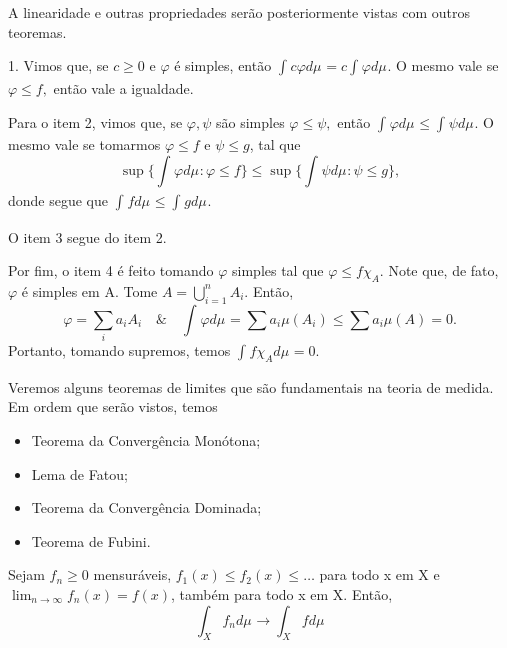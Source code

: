 \documentclass[MeasureTheory/measure_theory.tex]{subfiles}
\begin{document}
\begin{proof*}
	A linearidade e outras propriedades serão posteriormente vistas com outros teoremas.

	1. Vimos que, se \(c \geq 0\) e \(\varphi \) é simples, então \(\int_{}c \varphi  d\mu_{} = c \int_{}\varphi  d\mu_{}\). O mesmo vale se \(\varphi \leq f,\) então vale a igualdade.

	Para o item 2, vimos que, se \(\varphi, \psi\) são simples   \(\varphi \leq \psi,\) então \(\int_{}\varphi  d\mu_{} \leq \int_{}\psi d\mu_{}\). O mesmo vale se tomarmos \(\varphi \leq f\) e \(\psi \leq g\),
	tal que
	\[
		\sup_{}\biggl\{\int_{}\varphi  d\mu_{}: \varphi \leq f\biggr\} \leq \sup_{}\biggl\{\int_{}\psi d\mu_{}: \psi \leq g\biggr\},
	\]
	donde segue que \(\int_{}f d\mu_{} \leq \int_{}g d\mu_{}.\)

	O item 3 segue do item 2.

	Por fim, o item 4 é feito tomando \(\varphi \) simples tal que \(\varphi  \leq f \chi_{A}.\) Note que, de fato, \(\varphi \) é simples em A. Tome \(A = \bigcup_{i=1}^{n}A_{i}.\)
	Então,
	\[
		\varphi = \sum\limits_{i}^{}a_{i}A_{i} \quad\&\quad \int_{}\varphi  d\mu_{} = \sum\limits_{}^{}a_{i}\mu (A_{i}) \leq \sum\limits_{}^{}a_{i}\mu (A) = 0.
	\]
	Portanto, tomando supremos, temos \(\int_{}f \chi_{A} d\mu_{} = 0.\) \qedsymbol
\end{proof*}
Veremos alguns teoremas de limites que são fundamentais na teoria de medida. Em ordem que serão vistos, temos
\begin{itemize}
	\item Teorema da Convergência Monótona;
	\item Lema de Fatou;
	\item Teorema da Convergência Dominada;
	\item Teorema de Fubini.
\end{itemize}
\hypertarget{monotone_convergence}{\begin{theorem*}
		Sejam \(f_{n}\geq 0\) mensuráveis, \(f_{1}(x) \leq f_2(x) \leq \dotsc \) para todo x em X e \(\lim_{n\to \infty}f_{n}(x) = f(x)\), também para todo x em X. Então,
		\[
			\int_{X}f_{n} d\mu_{}\longrightarrow \int_{X}f d\mu_{}
		\]
	\end{theorem*}}
\end{document}
